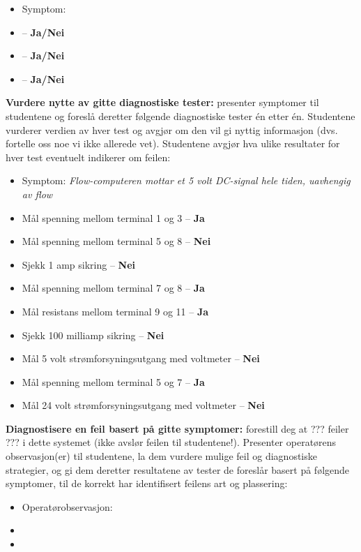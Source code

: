 \begin{itemize}
\item{} Symptom: {\it }
\item{}  -- {\bf Ja/Nei}
\item{}  -- {\bf Ja/Nei}
\item{}  -- {\bf Ja/Nei}
\end{itemize}


\vskip 10pt


\noindent
{\bf Vurdere nytte av gitte diagnostiske tester:} presenter symptomer til studentene og foreslå deretter følgende diagnostiske tester én etter én.  Studentene vurderer verdien av hver test og avgjør om den vil gi nyttig informasjon (dvs. fortelle oss noe vi ikke allerede vet).  Studentene avgjør hva ulike resultater for hver test eventuelt indikerer om feilen:

\begin{itemize}
\item{} Symptom: {\it Flow-computeren mottar et 5 volt DC-signal hele tiden, uavhengig av flow}
\item{} Mål spenning mellom terminal 1 og 3 -- {\bf Ja}
\item{} Mål spenning mellom terminal 5 og 8 -- {\bf Nei}
\item{} Sjekk 1 amp sikring -- {\bf Nei}
\item{} Mål spenning mellom terminal 7 og 8 -- {\bf Ja}
\item{} Mål resistans mellom terminal 9 og 11 -- {\bf Ja}
\item{} Sjekk 100 milliamp sikring -- {\bf Nei}
\item{} Mål 5 volt strømforsyningsutgang med voltmeter -- {\bf Nei}
\item{} Mål spenning mellom terminal 5 og 7 -- {\bf Ja}
\item{} Mål 24 volt strømforsyningsutgang med voltmeter -- {\bf Nei}
\end{itemize}


\vskip 10pt


\noindent
{\bf Diagnostisere en feil basert på gitte symptomer:} forestill deg at ??? feiler ??? i dette systemet (ikke avslør feilen til studentene!).  Presenter operatørens observasjon(er) til studentene, la dem vurdere mulige feil og diagnostiske strategier, og gi dem deretter resultatene av tester de foreslår basert på følgende symptomer, til de korrekt har identifisert feilens art og plassering:

\begin{itemize}
\item{} Operatørobservasjon: {\it }
\item{} 
\item{} 
\end{itemize}

